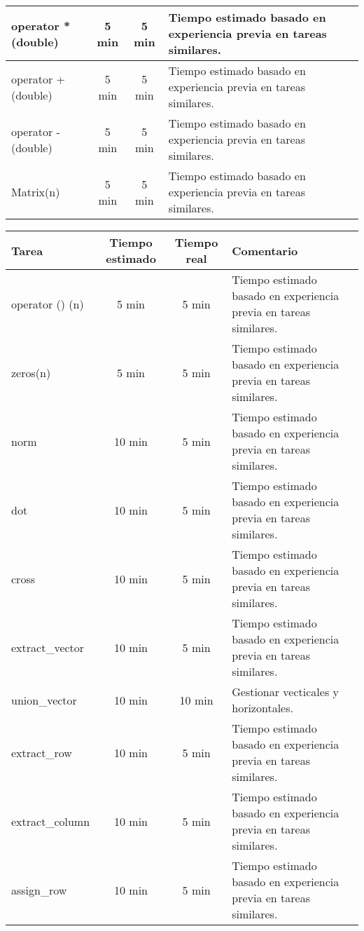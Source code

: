 \documentclass[12pt,a4paper]{article}
\begin{document}
\begin{center}
\begin{tabular}{|p{3cm}|c|c|p{6cm}|}
        \hline
        operator * (double) & 5 min & 5 min & Tiempo estimado basado en experiencia previa en tareas similares.\\
        \hline
        operator + (double) & 5 min & 5 min & Tiempo estimado basado en experiencia previa en tareas similares.\\
        \hline
        operator - (double) & 5 min & 5 min & Tiempo estimado basado en experiencia previa en tareas similares.\\
        \hline
        Matrix(n) & 5 min & 5 min & Tiempo estimado basado en experiencia previa en tareas similares.\\
        \hline
    \end{tabular}
 \end{center}


 \begin{center}
    \begin{tabular}{|p{3cm}|c|c|p{6cm}|}
        \hline
        \textbf{Tarea} & \textbf{Tiempo estimado} & \textbf{Tiempo real} & \textbf{Comentario} \\
        \hline
        operator () (n) & 5 min & 5 min & Tiempo estimado basado en experiencia previa en tareas similares.\\
        \hline
        zeros(n) & 5 min & 5 min & Tiempo estimado basado en experiencia previa en tareas similares.\\
        \hline
        norm & 10 min & 5 min & Tiempo estimado basado en experiencia previa en tareas similares.\\
        \hline
        dot & 10 min & 5 min & Tiempo estimado basado en experiencia previa en tareas similares.\\
        \hline
        cross & 10 min & 5 min & Tiempo estimado basado en experiencia previa en tareas similares.\\
        \hline
        extract\_vector & 10 min & 5 min & Tiempo estimado basado en experiencia previa en tareas similares.\\
        \hline
        union\_vector & 10 min & 10 min & Gestionar vecticales y horizontales.\\
        \hline
        extract\_row & 10 min & 5 min & Tiempo estimado basado en experiencia previa en tareas similares.\\
        \hline
        extract\_column & 10 min & 5 min & Tiempo estimado basado en experiencia previa en tareas similares.\\
        \hline
        assign\_row & 10 min & 5 min & Tiempo estimado basado en experiencia previa en tareas similares.\\

\end{tabular}
\end{center}
\end{document}
